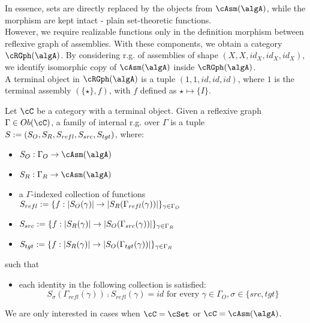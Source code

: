 \documentclass[12pt,a4paper]{article}
\def\src{_{src}}\alwaysmath{src}
\def\rfl{_{refl}}\alwaysmath{rfl}
\def\tgt{_{tgt}}\alwaysmath{tgt}
\renewcommand{\O}{_{O}}\alwaysmath{O}
\def\R{_{R}}\alwaysmath{R}
\begin{document}
In essence, sets are directly replaced by the objects from $\cAsm(\algA)$, while the morphism are kept intact - plain set-theoretic functions.\\
However, we require realizable functions only in the definition morphism between reflexive graph of assemblies. With these components, we obtain a category $\cRGph(\algA)$. By considering r.g. of assemblies of shape $(X,X,id_X,id_X,id_X)$, we identify isomorphic copy of $\cAsm(\algA)$ inside $\cRGph(\algA)$.\\
A terminal object in $\cRGph(\algA)$ is a tuple $(1, 1, id, id, id)$, where $1$ is the terminal assembly $(\{\star\},f)$, with $f$ defined as $\star \mapsto \{I\}$.

\begin{definition}
  \label{def:fam-refl-graphs}
  Let $\cC$ be a category with a terminal object. Given a reflexive graph $\Gamma \in \ob\cC$, a family of internal r.g. over $\Gamma$ is a tuple $S\define(S_O, S_R, S\rfl, S\src, S\tgt)$, where:
  \begin{itemize}[noitemsep]
    \item $S\O : \Gamma\O \to \cAsm(\algA)$
    \item $S\R : \Gamma\R \to \cAsm(\algA)$
    \item a $\Gamma$-indexed collection of functions $S\rfl \define \{f: \carr{S\O(\gamma)} \to \carr{S\R(\Gamma\rfl(\gamma))} \}_{\gamma \in \Gamma\O}$
    \item $S\src \define \{f: \carr{S\R(\gamma)} \to \carr{S\O(\Gamma\src(\gamma))} \}_{\gamma \in \Gamma\R}$
    \item $S\tgt \define \{f: \carr{S\R(\gamma)} \to \carr{S\O(\Gamma\tgt(\gamma))} \}_{\gamma \in \Gamma\R}$ 
  \end{itemize}
  such that 
  \begin{itemize}[noitemsep]
    \item each identity in the following collection is satisfied:
     $$S_\sigma(\Gamma\rfl(\gamma)) \comp S\rfl(\gamma) = id \text{ for every } \gamma \in \Gamma\O, \sigma \in \{src, tgt \}$$
  \end{itemize}

\end{definition}
We are only interested in cases when $\cC = \cSet$ or $\cC = \cAsm(\algA)$. 
\end{document}
